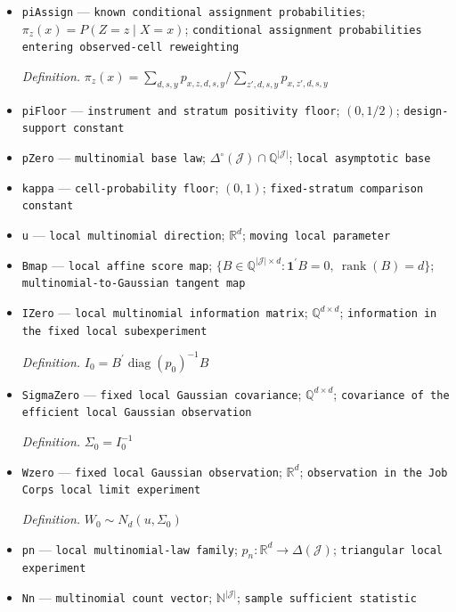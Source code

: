 \documentclass{article}
\begin{document}
\begin{itemize}
  \item \texttt{piAssign} --- \texttt{known conditional assignment probabilities}; \(\pi_z(x)=P(Z=z\mid X=x)\); \texttt{conditional assignment probabilities entering observed-\allowbreak{}cell reweighting}
  \par\smallskip\noindent\emph{Definition.} \(\pi_z(x)=\sum_{d,s,y}p_{x,z,d,s,y}/\sum_{z',d,s,y}p_{x,z',d,s,y}\)
  \item \texttt{piFloor} --- \texttt{instrument and stratum positivity floor}; \((0,1/2)\); \texttt{design-\allowbreak{}support constant}
  \item \texttt{pZero} --- \texttt{multinomial base law}; \(\Delta^{\circ}(\mathcal J)\cap\mathbb Q^{|\mathcal J|}\); \texttt{local asymptotic base}
  \item \texttt{kappa} --- \texttt{cell-\allowbreak{}probability floor}; \((0,1)\); \texttt{fixed-\allowbreak{}stratum comparison constant}
  \item \texttt{u} --- \texttt{local multinomial direction}; \(\mathbb R^d\); \texttt{moving local parameter}
  \item \texttt{Bmap} --- \texttt{local affine score map}; \(\{B\in\mathbb Q^{|\mathcal J|\times d}:\mathbf 1^{\prime}B=0,\ \operatorname{rank}(B)=d\}\); \texttt{multinomial-\allowbreak{}to-\allowbreak{}Gaussian tangent map}
  \item \texttt{IZero} --- \texttt{local multinomial information matrix}; \(\mathbb Q^{d\times d}\); \texttt{information in the fixed local subexperiment}
  \par\smallskip\noindent\emph{Definition.} \(I_0=B^{\prime}\operatorname{diag}(p_0)^{-1}B\)
  \item \texttt{SigmaZero} --- \texttt{fixed local Gaussian covariance}; \(\mathbb Q^{d\times d}\); \texttt{covariance of the efficient local Gaussian observation}
  \par\smallskip\noindent\emph{Definition.} \(\Sigma_0=I_0^{-1}\)
  \item \texttt{Wzero} --- \texttt{fixed local Gaussian observation}; \(\mathbb R^d\); \texttt{observation in the Job Corps local limit experiment}
  \par\smallskip\noindent\emph{Definition.} \(W_0\sim N_d(u,\Sigma_0)\)
  \item \texttt{pn} --- \texttt{local multinomial-\allowbreak{}law family}; \(p_n:\mathbb R^d\to\Delta(\mathcal J)\); \texttt{triangular local experiment}
  \item \texttt{Nn} --- \texttt{multinomial count vector}; \(\mathbb N^{|\mathcal J|}\); \texttt{sample sufficient statistic}

\end{itemize}
\end{document}
